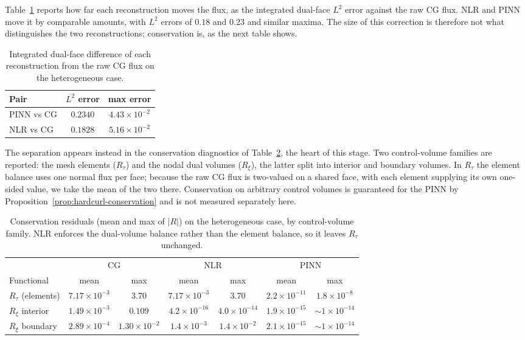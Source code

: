 \documentclass[a4paper,fleqn]{cas-sc}
\begin{document}
Table~\ref{tab:spe10_flux} reports how far each reconstruction moves the flux,
as the integrated dual-face \(L^2\) error against the raw CG flux. NLR and PINN
move it by comparable amounts, with \(L^2\) errors of \(0.18\) and \(0.23\) and
similar maxima. The size of this correction is therefore not what distinguishes
the two reconstructions; conservation is, as the next table shows.

\begin{table}[!htbp]
\centering
\caption{Integrated dual-face difference of each reconstruction from the raw CG
flux on the heterogeneous case.}
\label{tab:spe10_flux}
\begin{tabular}{lcc}
\toprule
Pair & \(L^2\) error & max error \\
\midrule
PINN vs CG     & \(0.2340\) & \(4.43\times10^{-2}\) \\
NLR vs CG      & \(0.1828\) & \(5.16\times10^{-2}\) \\
\bottomrule
\end{tabular}
\end{table}

The separation appears instead in the conservation diagnostics of
Table~\ref{tab:spe10_cons}, the heart of this stage. Two control-volume families
are reported: the mesh elements (\(R_\tau\)) and the nodal dual volumes
(\(R_\xi\)), the latter split into interior and boundary volumes. In \(R_\tau\)
the element balance uses one normal flux per face; because the raw CG flux is
two-valued on a shared face, with each element supplying its own one-sided value,
we take the mean of the two there. Conservation on arbitrary control volumes is
guaranteed for the PINN by Proposition~\ref{prop:hardcurl-conservation} and is not
measured separately here.

\begin{table}[!htbp]
\centering
\caption{Conservation residuals (mean and max of \(|R|\)) on the heterogeneous
case, by control-volume family. NLR enforces the dual-volume balance rather
than the element balance, so it leaves \(R_\tau\) unchanged.}
\label{tab:spe10_cons}
\begin{tabular}{lcccccc}
\toprule
 & \multicolumn{2}{c}{CG} & \multicolumn{2}{c}{NLR} & \multicolumn{2}{c}{PINN} \\
\cmidrule(lr){2-3}\cmidrule(lr){4-5}\cmidrule(lr){6-7}
Functional & mean & max & mean & max & mean & max \\
\midrule
\(R_\tau\) (elements)
 & \(7.17\times10^{-3}\) & \(3.70\)
 & \(7.17\times10^{-3}\) & \(3.70\)
 & \(2.2\times10^{-11}\) & \(1.8\times10^{-8}\) \\
\(R_\xi\) interior
 & \(1.49\times10^{-3}\) & \(0.109\)
 & \(4.2\times10^{-16}\) & \(4.0\times10^{-14}\)
 & \(1.9\times10^{-15}\) & \({\sim}1\times10^{-14}\) \\
\(R_\xi\) boundary
 & \(2.89\times10^{-4}\) & \(1.30\times10^{-2}\)
 & \(1.4\times10^{-3}\) & \(1.4\times10^{-2}\)
 & \(2.1\times10^{-15}\) & \({\sim}1\times10^{-14}\) \\
\bottomrule
\end{tabular}
\end{table}
\end{document}
